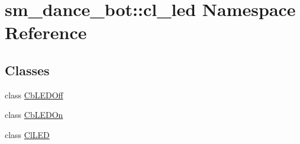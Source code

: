 \hypertarget{namespacesm__dance__bot_1_1cl__led}{}\section{sm\+\_\+dance\+\_\+bot\+:\+:cl\+\_\+led Namespace Reference}
\label{namespacesm__dance__bot_1_1cl__led}
\subsection*{Classes}
\begin{DoxyCompactItemize}
\item 
class \hyperlink{classsm__dance__bot_1_1cl__led_1_1CbLEDOff}{Cb\+L\+E\+D\+Off}
\item 
class \hyperlink{classsm__dance__bot_1_1cl__led_1_1CbLEDOn}{Cb\+L\+E\+D\+On}
\item 
class \hyperlink{classsm__dance__bot_1_1cl__led_1_1ClLED}{Cl\+L\+ED}
\end{DoxyCompactItemize}

